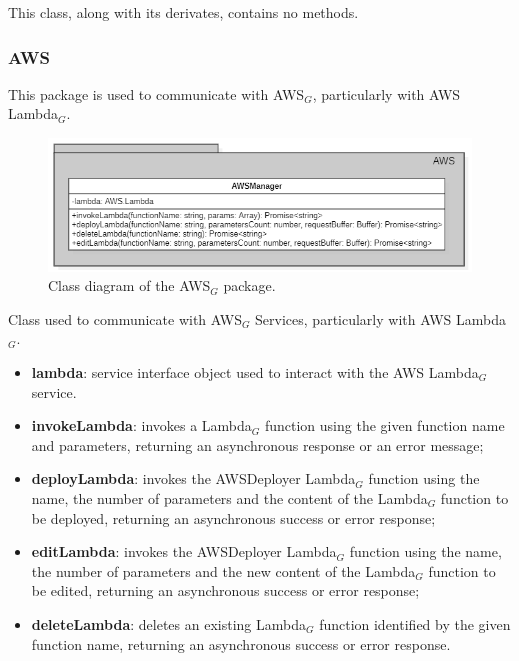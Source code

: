 	This class, along with its derivates, contains no methods.
	\subsubsection{AWS}
	This package is used to communicate with AWS$_{G}$, particularly with AWS Lambda$_{G}$.
	\begin{figure} [h!]
		\centering
		\includegraphics[width=0.8\linewidth]{diagrammi/etherless-server/AWS}
		\caption{Class diagram of the AWS$_{G}$ package.}
	\end{figure}
	Class used to communicate with AWS$_{G}$ Services, particularly with AWS Lambda$_{G}$.
	\begin{itemize}
		\item \textbf{lambda}: service interface object used to interact with the AWS Lambda$_{G}$ service.
	\end{itemize}
	\begin{itemize}
		\item \textbf{invokeLambda}: invokes a Lambda$_{G}$ function using the given function name and parameters, returning an asynchronous response or an error message;
		\item \textbf{deployLambda}: invokes the AWSDeployer Lambda$_{G}$ function using the name, the number of parameters and the content of the Lambda$_{G}$ function to be deployed, returning an asynchronous success or error response;
		\item \textbf{editLambda}: invokes the AWSDeployer Lambda$_{G}$ function using the name, the number of parameters and the new content of the Lambda$_{G}$ function to be edited, returning an asynchronous success or error response;
		\item \textbf{deleteLambda}: deletes an existing Lambda$_{G}$ function identified by the given function name, returning an asynchronous success or error response.
	\end{itemize}
